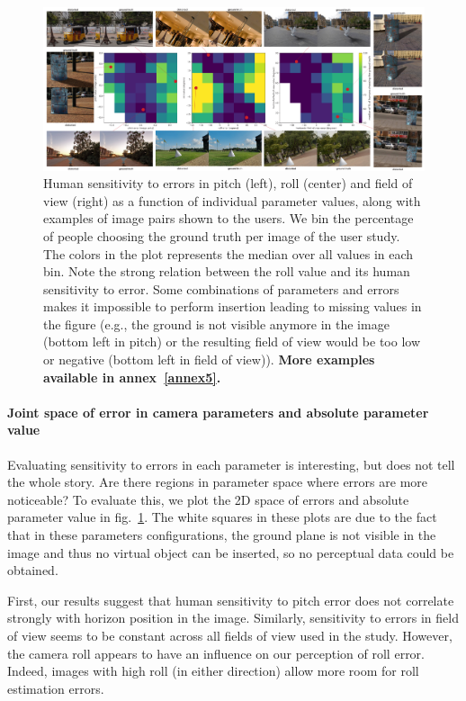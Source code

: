 \begin{figure}
\centering
\includegraphics[width=\linewidth]{figures/pstudy/pstudy.pdf}
\caption[Human sensitivity to errors in calibration per parameter]{Human sensitivity to errors in pitch (left), roll (center) and field of view (right) as a function of individual parameter values, along with examples of image pairs shown to the users. We bin the percentage of people choosing the ground truth per image of the user study. The colors in the plot represents the median over all values in each bin. Note the strong relation between the roll value and its human sensitivity to error. Some combinations of parameters and errors makes it impossible to perform insertion leading to missing values in the figure (e.g., the ground is not visible anymore in the image (bottom left in pitch) or the resulting field of view would be too low or negative (bottom left in field of view)). \textbf{More examples available in annex~\ref{annex5}.}}
\label{fig:pstudy_sensitivity_per_parameter}
\end{figure}

\paragraph{Joint space of error in camera parameters and absolute parameter value}

Evaluating sensitivity to errors in each parameter is interesting, but does not tell the whole story. Are there regions in parameter space where errors are more noticeable? To evaluate this, we plot the 2D space of errors and absolute parameter value in fig.~\ref{fig:pstudy_sensitivity_per_parameter}. The white squares in these plots are due to the fact that in these parameters configurations, the ground plane is not visible in the image and thus no virtual object can be inserted, so no perceptual data could be obtained.

First, our results suggest that human sensitivity to pitch error does not correlate strongly with horizon position in the image. Similarly, sensitivity to errors in field of view seems to be constant across all fields of view used in the study. However, the camera roll appears to have an influence on our perception of roll error. Indeed, images with high roll (in either direction) allow more room for roll estimation errors. 

